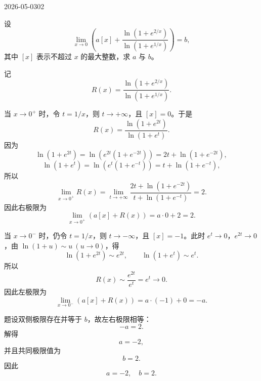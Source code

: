 \begin{mistake}{2026-05-03}{02}

\begin{problemcontent}
设
\[
\lim_{x\to 0}\left(a[x]+\frac{\ln(1+e^{2/x})}{\ln(1+e^{1/x})}\right)=b,
\]
其中 \([x]\) 表示不超过 \(x\) 的最大整数，求 \(a\) 与 \(b\)。
\end{problemcontent}

\begin{solutioncontent}
记
\[
R(x)=\frac{\ln(1+e^{2/x})}{\ln(1+e^{1/x})}.
\]

当 \(x\to0^+\) 时，令 \(t=1/x\)，则 \(t\to+\infty\)，且 \([x]=0\)。于是
\[
R(x)=\frac{\ln(1+e^{2t})}{\ln(1+e^t)}.
\]
因为
\[
\ln(1+e^{2t})=\ln\left(e^{2t}(1+e^{-2t})\right)=2t+\ln(1+e^{-2t}),
\]
\[
\ln(1+e^t)=\ln\left(e^t(1+e^{-t})\right)=t+\ln(1+e^{-t}),
\]
所以
\[
\lim_{x\to0^+}R(x)
=\lim_{t\to+\infty}\frac{2t+\ln(1+e^{-2t})}{t+\ln(1+e^{-t})}=2.
\]
因此右极限为
\[
\lim_{x\to0^+}\left(a[x]+R(x)\right)=a\cdot0+2=2.
\]

当 \(x\to0^-\) 时，仍令 \(t=1/x\)，则 \(t\to-\infty\)，且 \([x]=-1\)。此时 \(e^t\to0\)，\(e^{2t}\to0\)，由 \(\ln(1+u)\sim u\ (u\to0)\)，得
\[
\ln(1+e^{2t})\sim e^{2t},\qquad \ln(1+e^t)\sim e^t.
\]
所以
\[
R(x)\sim\frac{e^{2t}}{e^t}=e^t\to0.
\]
因此左极限为
\[
\lim_{x\to0^-}\left(a[x]+R(x)\right)=a\cdot(-1)+0=-a.
\]

题设双侧极限存在并等于 \(b\)，故左右极限相等：
\[
-a=2.
\]
解得
\[
a=-2,
\]
并且共同极限值为
\[
b=2.
\]
因此
\[
\boxed{a=-2,\quad b=2}.
\]
\end{solutioncontent}


\end{mistake}
